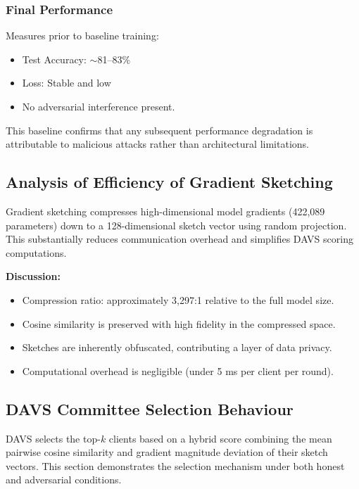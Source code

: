 \documentclass[12pt,a4paper]{article}
\begin{document}
\subsubsection{Final Performance}
Measures prior to baseline training:
\begin{itemize}
    \item Test Accuracy: $\sim$81--83\%
    \item Loss: Stable and low
    \item No adversarial interference present.
\end{itemize}
This baseline confirms that any subsequent performance degradation is attributable to malicious attacks rather than architectural limitations.

\subsection{Analysis of Efficiency of Gradient Sketching}
Gradient sketching compresses high-dimensional model gradients (422,089 parameters) down to a 128-dimensional sketch vector using random projection. This substantially reduces communication overhead and simplifies DAVS scoring computations.

\textbf{Discussion:}
\begin{itemize}
    \item Compression ratio: approximately 3,297:1 relative to the full model size.
    \item Cosine similarity is preserved with high fidelity in the compressed space.
    \item Sketches are inherently obfuscated, contributing a layer of data privacy.
    \item Computational overhead is negligible (under 5 ms per client per round).
\end{itemize}

\subsection{DAVS Committee Selection Behaviour}
DAVS selects the top-$k$ clients based on a hybrid score combining the mean pairwise cosine similarity and gradient magnitude deviation of their sketch vectors. This section demonstrates the selection mechanism under both honest and adversarial conditions.
\end{document}
